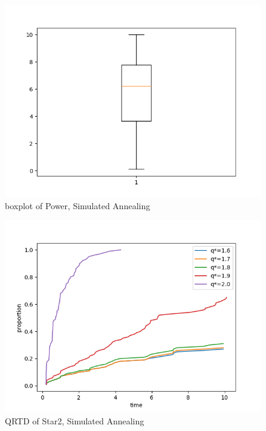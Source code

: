 \documentclass[acmlarge]{acmart}
\begin{document}
\begin{figure}[h]
	\includegraphics[width=\linewidth]{power_boxplot_LS1.png}
	\caption{boxplot of Power, Simulated Annealing}
\end{figure}


\begin{figure}[h]
	\includegraphics[width=\linewidth]{star2_QRTD_LS1.png}
	\caption{QRTD of Star2, Simulated Annealing}
\end{figure}
\end{document}
